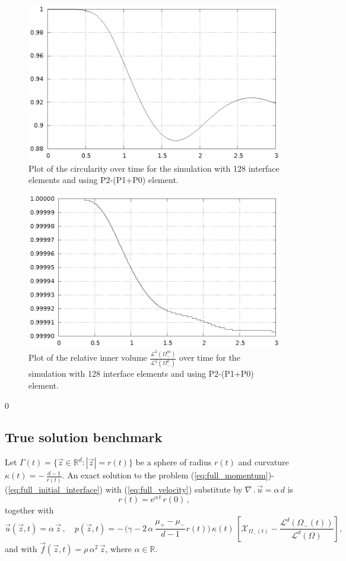 \documentclass[a4paper,12pt,onecolumn]{article}
\newcommand{\R}{{\mathbb R}}
\newcommand{\bigchi}{\ensuremath{\mathrm{\mathcal{X}}}}
\newcommand{\charfcn}[1]{\bigchi_{#1}} %
\begin{document}
\begin{figure}[htbp]
\centering
\includegraphics[width=.45\textwidth]
{figures/2d_benchmark1_circularity_p1p0_128.ps}
\caption{Plot of the circularity over time for the simulation with 128
interface elements and using P2-(P1+P0) element.}
\label{fig:2d_benchmark1_circularity}
\end{figure}

\begin{figure}[htbp]
\centering
\includegraphics[width=.45\textwidth]
{figures/2d_benchmark1_inner_volume_p1p0_128.ps}
\caption{Plot of the relative inner volume
$\frac{\mathcal{L}^2(\Omega^m_-)}{\mathcal{L}^2(\Omega^0_-)}$ over time for the
simulation with 128 interface elements and using P2-(P1+P0) element.}
\label{fig:2d_benchmark1_volume}
\end{figure}

\setcounter{equation} 0
\subsection{True solution benchmark}

Let $\Gamma(t) = \{ \vec z \in \R^d : |\vec z| = r(t)\}$ be a sphere of radius
$r(t)$ and curvature $\kappa(t) = -\,\frac{d-1}{r(t)}$.
An exact solution to the problem
(\ref{eq:full_momentum})-(\ref{eq:full_initial_interface}) with
(\ref{eq:full_velocity}) substitute by $\nabla\,.\,\vec u = \alpha\,d$ is
\begin{equation} \label{eq:r_benchmark1}
r(t) = \mathrm{e}^{\alpha\,t}\,r(0)\,,
\end{equation}
together with
\begin{equation} \label{eq:up_benchmark1}
\vec u(\vec z, t) = \alpha\,\vec z \,, \quad
p(\vec z, t) = -\,\bigg(\gamma - 2\,\alpha\,\frac{\mu_+ - \mu_-}
{d-1}r(t)\bigg)\,\kappa(t)\,\left[ \charfcn{\Omega_-(t)} -
\frac{\mathcal{L}^d(\Omega_-(t))}{\mathcal{L}^d(\Omega)}\right],
\end{equation}
and with $\vec f(\vec z, t) = \rho\,\alpha^2\,\vec z$, where $\alpha \in \R$.
\end{document}
